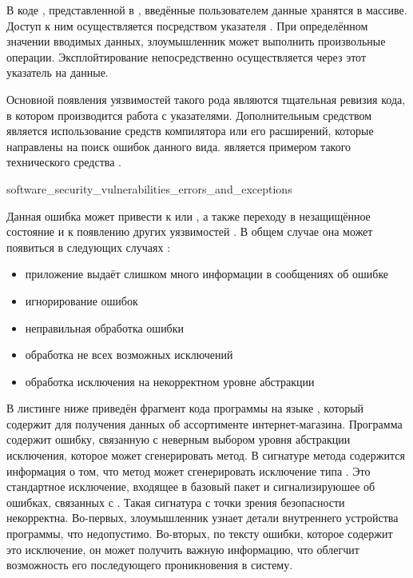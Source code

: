 %
В коде , представленной в , введённые пользователем данные хранятся в массиве.
%
Доступ к ним осуществляется посредством указателя . 
%
При определённом значении вводимых данных, злоумышленник может выполнить произвольные операции. 
%
Эксплойтирование непосредственно осуществляется через этот указатель на данные.

%
Основной  появления уязвимостей такого рода являются тщательная ревизия кода, в котором производится работа с указателями. 
%
Дополнительным средством является использование средств компилятора или его расширений, которые направлены на поиск ошибок данного вида. 
%
 является примером такого технического средства . 


	{software_security_vulnerabilities_errors_and_exceptions}

%
%
Данная ошибка может привести к  или , а также переходу в незащищённое состояние и к появлению других уязвимостей  . 
%
В общем случае она может появиться в следующих случаях :
\begin{itemize}
	\item приложение выдаёт слишком много информации в сообщениях об ошибке 
	\item игнорирование ошибок 
	\item неправильная обработка ошибки 
	\item обработка не всех возможных исключений 
	\item обработка исключения на некорректном уровне абстракции 
\end{itemize}

%
В листинге ниже приведён фрагмент кода программы на языке , который содержит  для получения данных об ассортименте интернет-магазина. 
%
Программа содержит ошибку, связанную с неверным выбором уровня абстракции исключения, которое может сгенерировать метод. 
%
В сигнатуре метода  содержится информация о том, что метод может сгенерировать исключение типа . 
%
Это стандартное исключение, входящее в базовый пакет  и сигнализируюшее об ошибках, связанных с . 
%
Такая сигнатура с точки зрения безопасности некорректна. 
%
Во-первых, злоумышленник узнает детали внутреннего устройства программы, что недопустимо. 
%
Во-вторых, по тексту ошибки, которое содержит это исключение, он может получить важную информацию, что облегчит возможность его последующего проникновения в систему. 

